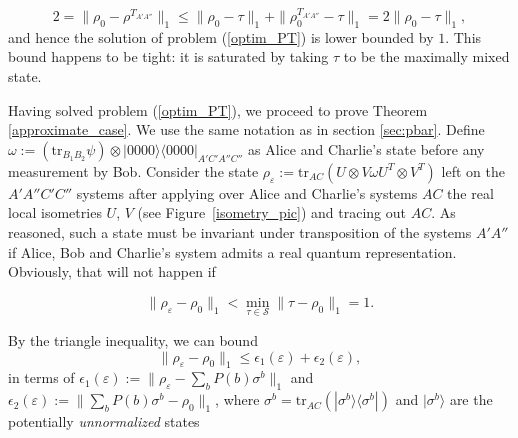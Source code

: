 \documentclass[onecolumn,prx,amsmath,amssymb]{revtex4-2}
\def\be{\begin{equation}}
\def\ee{\end{equation}}
\def\bra#1{\langle#1|} \def\ket#1{|#1\rangle}
\def\ketbra#1#2{\ket{#1}\!\bra{#2}}
\def\tr{\mbox{tr}}
\def\norm#1{\| #1 \| }
\begin{document}
\begin{appendix}
\be
2=\|\rho_0-\rho^{T_{A'A''}}\|_1\leq \|\rho_0-\tau\|_1+\|\rho^{T_{A'A''}}_0-\tau\|_1=2\|\rho_0-\tau\|_1,
\ee
\noindent and hence the solution of problem (\ref{optim_PT}) is lower bounded by $1$. This bound happens to be tight: it is saturated by taking $\tau$ to be the maximally mixed state.

Having solved problem (\ref{optim_PT}), we proceed to prove Theorem \ref{approximate_case}. We use the same notation as in section \ref{sec:pbar}. Define $\omega:=(\tr_{B_1B_2}\psi)\otimes\ketbra{0000}{0000}_{A'C'A''C''}$ as Alice and Charlie's state before any measurement by Bob. Consider the state $\rho_\varepsilon:=\tr_{{AC}}(U\otimes V \omega U^T\otimes V^T)$ left on the $A'A''C'C''$ systems after applying over Alice and Charlie's systems ${AC}$ the real local isometries $U$, $V$ (see Figure~\ref{isometry_pic}) and tracing out ${AC}$.  As reasoned, such a state must be invariant under transposition of the systems $A'A''$ if Alice, Bob and Charlie's system admits a real quantum representation. Obviously, that will not happen if

\be
\norm{\rho_{\varepsilon}-\rho_0}_1 < \min_{\tau \in \mathcal{S}}\norm{\tau-\rho_0}_1=1.
\label{trace_norm_arg}
\ee

By the triangle inequality, we can bound
\begin{equation}\label{eq:normbnd}
\norm{\rho_{\varepsilon}-\rho_0}_1\leq \epsilon_1(\varepsilon)+\epsilon_2(\varepsilon),
\end{equation}
in terms of $\epsilon_1(\varepsilon) :=\norm{\rho_{\varepsilon}-\sum_b P(b) \sigma^b}_1$ and $\epsilon_2(\varepsilon) :=\norm{\sum_b P(b) \sigma^b-\rho_0}_1$, where $\sigma^b= \tr_{{AC}}(\ketbra{\sigma^b}{\sigma^b})$ and $\ket{\sigma^b}$ are the potentially {\em unnormalized} states


\end{appendix}
\end{document}
